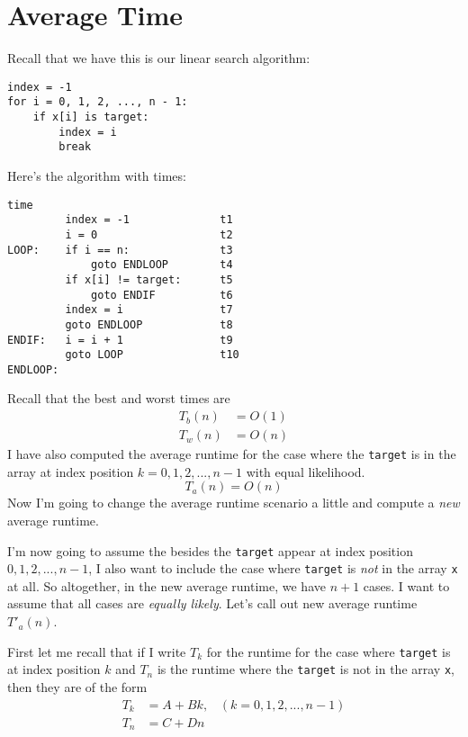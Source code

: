 

\section{Average Time}

Recall that we have this is our linear search algorithm:

\begin{Verbatim}[frame=single, fontsize=\footnotesize]
index = -1
for i = 0, 1, 2, ..., n - 1:
    if x[i] is target:
        index = i
        break
\end{Verbatim}

Here's the algorithm with times:
\begin{Verbatim}[frame=single,commandchars=\\\{\}, fontsize=\footnotesize]
                                 time   
         index = -1              t1 
         i = 0                   t2 
LOOP:    if i == n:              t3  
             goto ENDLOOP        t4 
         if x[i] != target:      t5
             goto ENDIF          t6
         index = i               t7 
         goto ENDLOOP            t8
ENDIF:   i = i + 1               t9 
         goto LOOP               t10 
ENDLOOP:
\end{Verbatim}

Recall that the best and worst times are
\begin{align*}
T_b(n) &= O(1) \\
T_w(n) &= O(n)
\end{align*}
I have also computed the average runtime for the case where the 
\verb!target! is in the array at index position 
$k = 0, 1, 2, ..., n - 1$ with equal likelihood.
\[
T_a(n) = O(n)
\]
Now I'm going to change the average runtime scenario
a little and compute a
\textit{new} average runtime.

I'm now going to assume the besides the \verb!target! appear
at index position $0, 1, 2, ..., n - 1$,
I also want to include the case where \verb!target! is \textit{not} in the array 
\verb!x! at all.
So altogether, in the new average runtime, we have $n + 1$ cases.
I want to assume that all cases are \textit{equally likely}.
Let's call out new average runtime $T'_a(n)$.

First let me recall that if I write $T_k$ for the runtime for 
the case where \verb!target! is at index position $k$
and $T_n$ is the runtime where the \verb!target! is not in the array
\verb!x!, then they are of the form
\begin{align*}
T_k &= A + Bk, \,\,\,\,\,(k = 0, 1, 2,..., n - 1) \\
T_n &= C + Dn
\end{align*}

